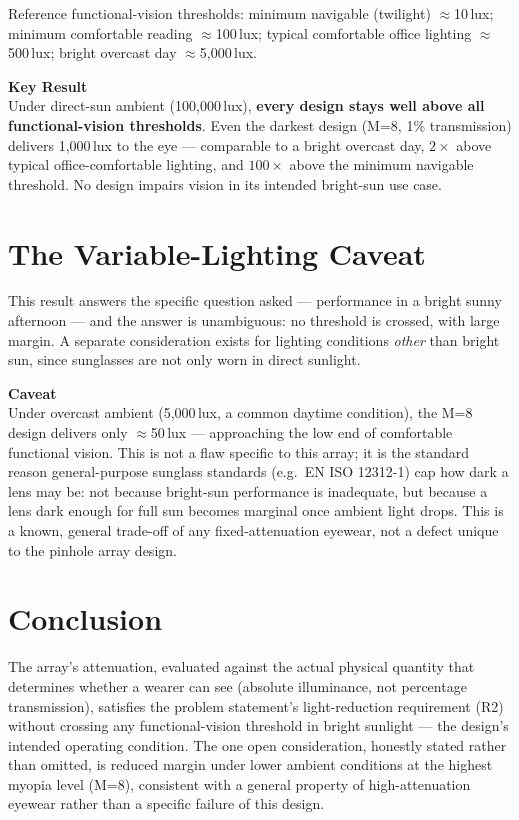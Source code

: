 \documentclass[11pt]{article}
\newcommand{\findbox}[1]{\par\noindent\colorbox{orange!14}{\begin{minipage}{\dimexpr\textwidth-2\fboxsep\relax}\vspace{2pt}\textbf{Key Result}\\[3pt]#1\vspace{2pt}\end{minipage}}\par\vspace{6pt}}
\newcommand{\notebox}[1]{\par\noindent\colorbox{gray!10}{\begin{minipage}{\dimexpr\textwidth-2\fboxsep\relax}\vspace{2pt}\textbf{Caveat}\\[3pt]#1\vspace{2pt}\end{minipage}}\par\vspace{6pt}}
\begin{document}
\noindent Reference functional-vision thresholds: minimum navigable
(twilight) $\approx$10\,lux; minimum comfortable reading $\approx$100\,lux;
typical comfortable office lighting $\approx$500\,lux; bright overcast
day $\approx$5{,}000\,lux.

\findbox{
Under direct-sun ambient (100{,}000\,lux), \textbf{every design stays well
above all functional-vision thresholds}. Even the darkest design (M=8,
1\% transmission) delivers 1{,}000\,lux to the eye --- comparable to a
bright overcast day, $2\times$ above typical office-comfortable lighting,
and $100\times$ above the minimum navigable threshold. No design impairs
vision in its intended bright-sun use case.
}

\section{The Variable-Lighting Caveat}
This result answers the specific question asked --- performance in a
bright sunny afternoon --- and the answer is unambiguous: no threshold is
crossed, with large margin. A separate consideration exists for lighting
conditions \emph{other} than bright sun, since sunglasses are not only
worn in direct sunlight.

\notebox{
Under overcast ambient (5{,}000\,lux, a common daytime condition), the
M=8 design delivers only $\approx$50\,lux --- approaching the low end of
comfortable functional vision. This is not a flaw specific to this array;
it is the standard reason general-purpose sunglass standards (e.g.\ EN ISO
12312-1) cap how dark a lens may be: not because bright-sun performance is
inadequate, but because a lens dark enough for full sun becomes marginal
once ambient light drops. This is a known, general trade-off of any
fixed-attenuation eyewear, not a defect unique to the pinhole array
design.
}

\section{Conclusion}
The array's attenuation, evaluated against the actual physical quantity
that determines whether a wearer can see (absolute illuminance, not
percentage transmission), satisfies the problem statement's light-reduction
requirement (R2) without crossing any functional-vision threshold in
bright sunlight --- the design's intended operating condition. The one
open consideration, honestly stated rather than omitted, is reduced
margin under lower ambient conditions at the highest myopia level (M=8),
consistent with a general property of high-attenuation eyewear rather
than a specific failure of this design.
\end{document}
